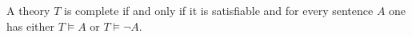 

\setcounter{section}{3}
\setcounter{subsection}{1}
\setcounter{dfn}{11}

\begin{lem}
A theory $T$ is complete if and only if it is satisfiable and for every sentence $A$ one has either $T \vDash A$ or $T \vDash \neg A$.
\end{lem}


